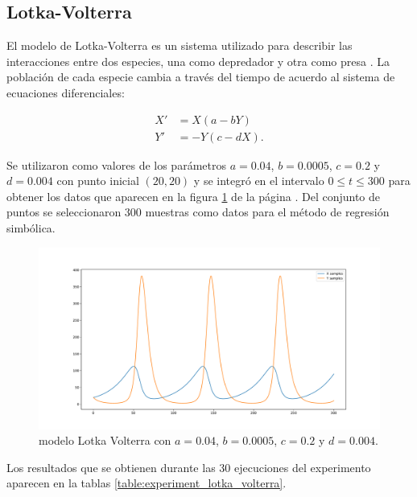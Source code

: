 \subsection{Lotka-Volterra}

El modelo de Lotka-Volterra es un sistema utilizado para describir las interacciones entre dos especies, una como depredador y otra como presa \cite{Hoppensteadt:2006}. La población de cada especie cambia a través del tiempo de acuerdo al sistema de ecuaciones diferenciales:

\begin{align*}
    X' & = X (a - b Y)   \\
    Y' & = -Y (c - d X).
\end{align*}

Se utilizaron como valores de los parámetros $a = 0.04$, $b = 0.0005$, $c = 0.2$ y $d = 0.004$ con punto inicial $(20, 20)$ y se integró en el intervalo $0 \leq t \leq 300$ para obtener los datos que aparecen en la figura \ref{fig:lotka_volterra} de la página \pageref{fig:lotka_volterra}. Del conjunto de puntos se seleccionaron 300 muestras como datos para el método de regresión simbólica.

\begin{figure}[h]
    \centering
    \includegraphics[width=\textwidth]{"figures/lotka_volterra.pdf"}
    \caption{modelo Lotka Volterra con $a = 0.04$, $b = 0.0005$, $c = 0.2$ y $d = 0.004$.}
    \label{fig:lotka_volterra}
\end{figure}

Los resultados que se obtienen durante las 30 ejecuciones del experimento aparecen en la tablas \ref{table:experiment_lotka_volterra}.

